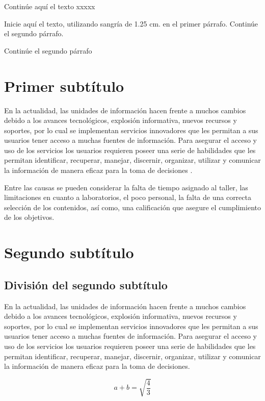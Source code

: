   Continúe aquí el texto xxxxx
  
Inicie aquí el texto, utilizando sangría de 1.25 cm. en el primer
párrafo. Continúe el segundo párrafo.

Continúe el segundo párrafo

\section{Primer subtítulo}

En la actualidad, las unidades de información hacen frente a muchos cambios
debido a los avances tecnológicos, explosión informativa, nuevos recursos y
soportes, por lo cual se implementan servicios innovadores que les permitan a
sus usuarios tener acceso a muchas fuentes de información. Para asegurar el
acceso y uso de los servicios los usuarios requieren poseer una serie de
habilidades que les permitan identificar, recuperar, manejar, discernir,
organizar, utilizar y comunicar la información de manera eficaz para la toma de
decisiones \cite{Reumann2012}.

Entre las causas se pueden considerar la falta de tiempo asignado al taller,
las limitaciones en cuanto a laboratorios, el poco personal, la falta de una
correcta selección de los contenidos, así como, una calificación que asegure el
cumplimiento de los objetivos.


\section{Segundo subtítulo}

\subsection{División del segundo subtítulo}

En la actualidad, las unidades de información hacen frente a muchos cambios
debido a los avances tecnológicos, explosión informativa, nuevos recursos y
soportes, por lo cual se implementan servicios innovadores que les permitan a
sus usuarios tener acceso a muchas fuentes de información. Para asegurar el
acceso y uso de los servicios los usuarios requieren poseer una serie de
habilidades que les permitan identificar, recuperar, manejar, discernir,
organizar, utilizar y comunicar la información de manera eficaz para la toma de
decisiones.

\begin{equation}
  \label{eq:1}
  a+b=\sqrt{\frac{4}{3}}
\end{equation}


